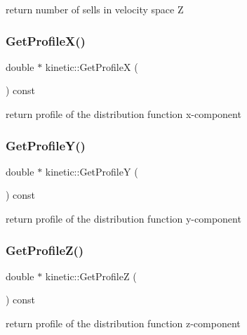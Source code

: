 return number of sells in velocity space Z 

\mbox{\label{classkinetic_ab994b8c6236881440ac410168bc9405e}} 
\subsubsection{\texorpdfstring{Get\+Profile\+X()}{GetProfileX()}}
{\footnotesize\ttfamily double $\ast$ kinetic\+::\+Get\+ProfileX (\begin{DoxyParamCaption}{ }\end{DoxyParamCaption}) const}



return profile of the distribution function x-\/component 

\mbox{\label{classkinetic_a73c1b7ab68870948599682f999e82fa6}} 
\subsubsection{\texorpdfstring{Get\+Profile\+Y()}{GetProfileY()}}
{\footnotesize\ttfamily double $\ast$ kinetic\+::\+Get\+ProfileY (\begin{DoxyParamCaption}{ }\end{DoxyParamCaption}) const}



return profile of the distribution function y-\/component 

\mbox{\label{classkinetic_aa4c537077cc449d37cb152e972a4811b}} 
\subsubsection{\texorpdfstring{Get\+Profile\+Z()}{GetProfileZ()}}
{\footnotesize\ttfamily double $\ast$ kinetic\+::\+Get\+ProfileZ (\begin{DoxyParamCaption}{ }\end{DoxyParamCaption}) const}



return profile of the distribution function z-\/component 

